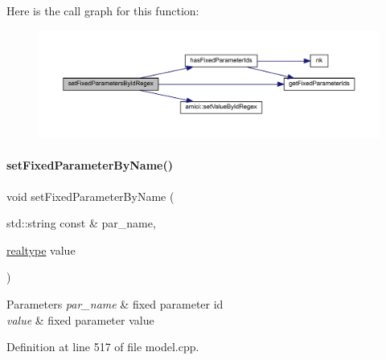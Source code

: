 Here is the call graph for this function\+:
\nopagebreak
\begin{figure}[H]
\begin{center}
\leavevmode
\includegraphics[width=350pt]{classamici_1_1_model_acda9b9debfd3d6ac77e2d27a48bfb5d6_cgraph}
\end{center}
\end{figure}
\mbox{\label{classamici_1_1_model_af1225439bd6deceb98b224e75a960800}} 
\paragraph{\texorpdfstring{set\+Fixed\+Parameter\+By\+Name()}{setFixedParameterByName()}}
{\footnotesize\ttfamily void set\+Fixed\+Parameter\+By\+Name (\begin{DoxyParamCaption}\item[{std\+::string const \&}]{par\+\_\+name,  }\item[{\mbox{\hyperlink{namespaceamici_a1bdce28051d6a53868f7ccbf5f2c14a3}{realtype}}}]{value }\end{DoxyParamCaption})}


\begin{DoxyParams}{Parameters}
{\em par\+\_\+name} & fixed parameter id \\
\hline
{\em value} & fixed parameter value \\
\hline
\end{DoxyParams}


Definition at line 517 of file model.\+cpp.

